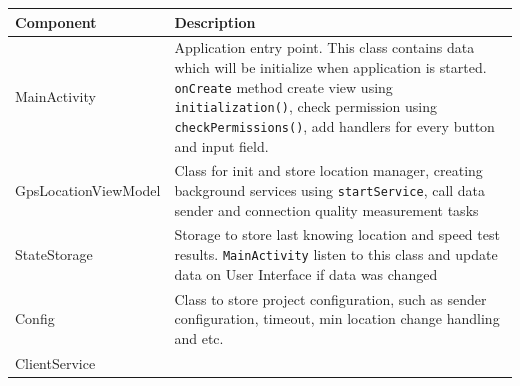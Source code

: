 \begin{longtable}[]{@{}ll@{}}
\toprule
\begin{minipage}[b]{0.3\columnwidth}\raggedright
Component\strut
\end{minipage} & \begin{minipage}[b]{0.6\columnwidth}\raggedright
Description\strut
\end{minipage}\tabularnewline
\midrule
\endhead
\begin{minipage}[t]{0.3\columnwidth}\raggedright
MainActivity\strut
\end{minipage} & \begin{minipage}[t]{0.6\columnwidth}\raggedright
Application entry point. This class contains data which will be
initialize when application is started. \texttt{onCreate} method create
view using \texttt{initialization()}, check permission using
\texttt{checkPermissions()}, add handlers for every button and input
field.\strut
\end{minipage}\tabularnewline
\begin{minipage}[t]{0.3\columnwidth}\raggedright
GpsLocationViewModel\strut
\end{minipage} & \begin{minipage}[t]{0.6\columnwidth}\raggedright
Class for init and store location manager, creating background services
using \texttt{startService}, call data sender and connection quality
measurement tasks\strut
\end{minipage}\tabularnewline
\begin{minipage}[t]{0.3\columnwidth}\raggedright
StateStorage\strut
\end{minipage} & \begin{minipage}[t]{0.6\columnwidth}\raggedright
Storage to store last knowing location and speed test results.
\texttt{MainActivity} listen to this class and update data on User
Interface if data was changed\strut
\end{minipage}\tabularnewline
\begin{minipage}[t]{0.3\columnwidth}\raggedright
Config\strut
\end{minipage} & \begin{minipage}[t]{0.6\columnwidth}\raggedright
Class to store project configuration, such as sender configuration,
timeout, min location change handling and etc.\strut
\end{minipage}\tabularnewline
\begin{minipage}[t]{0.3\columnwidth}\raggedright
ClientService\strut
\end{minipage} & \begin{minipage}[t]{0.6\columnwidth}\raggedright

\end{minipage}
\end{longtable}
